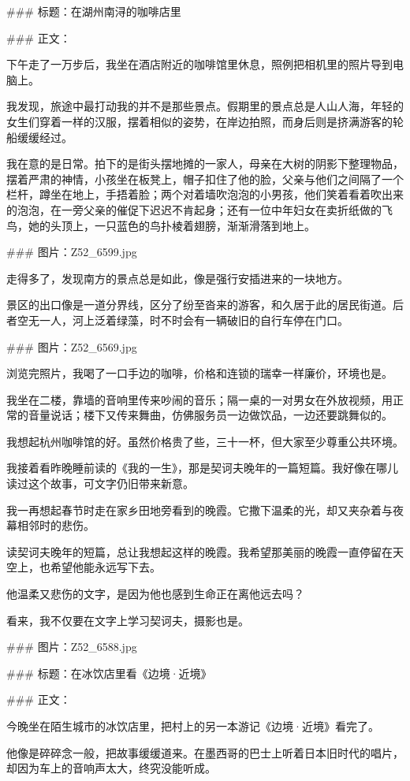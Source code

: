 ### 标题：在湖州南浔的咖啡店里




### 正文：

下午走了一万步后，我坐在酒店附近的咖啡馆里休息，照例把相机里的照片导到电脑上。

我发现，旅途中最打动我的并不是那些景点。假期里的景点总是人山人海，年轻的女生们穿着一样的汉服，摆着相似的姿势，在岸边拍照，而身后则是挤满游客的轮船缓缓经过。

我在意的是日常。拍下的是街头摆地摊的一家人，母亲在大树的阴影下整理物品，摆着严肃的神情，小孩坐在板凳上，帽子扣住了他的脸，父亲与他们之间隔了一个栏杆，蹲坐在地上，手捂着脸；两个对着墙吹泡泡的小男孩，他们笑着看着吹出来的泡泡，在一旁父亲的催促下迟迟不肯起身；还有一位中年妇女在卖折纸做的飞鸟，她的头顶上，一只蓝色的鸟扑棱着翅膀，渐渐滑落到地上。

### 图片：Z52_6599.jpg


走得多了，发现南方的景点总是如此，像是强行安插进来的一块地方。

景区的出口像是一道分界线，区分了纷至沓来的游客，和久居于此的居民街道。后者空无一人，河上泛着绿藻，时不时会有一辆破旧的自行车停在门口。

### 图片：Z52_6569.jpg

浏览完照片，我喝了一口手边的咖啡，价格和连锁的瑞幸一样廉价，环境也是。

我坐在二楼，靠墙的音响里传来吵闹的音乐；隔一桌的一对男女在外放视频，用正常的音量说话；楼下又传来舞曲，仿佛服务员一边做饮品，一边还要跳舞似的。

我想起杭州咖啡馆的好。虽然价格贵了些，三十一杯，但大家至少尊重公共环境。

我接着看昨晚睡前读的《我的一生》，那是契诃夫晚年的一篇短篇。我好像在哪儿读过这个故事，可文字仍旧带来新意。

我一再想起春节时走在家乡田地旁看到的晚霞。它撒下温柔的光，却又夹杂着与夜幕相邻时的悲伤。

读契诃夫晚年的短篇，总让我想起这样的晚霞。我希望那美丽的晚霞一直停留在天空上，也希望他能永远写下去。

他温柔又悲伤的文字，是因为他也感到生命正在离他远去吗？

看来，我不仅要在文字上学习契诃夫，摄影也是。

### 图片：Z52_6588.jpg


### 标题：在冰饮店里看《边境·近境》

### 正文：

今晚坐在陌生城市的冰饮店里，把村上的另一本游记《边境·近境》看完了。

他像是碎碎念一般，把故事缓缓道来。在墨西哥的巴士上听着日本旧时代的唱片，却因为车上的音响声太大，终究没能听成。

